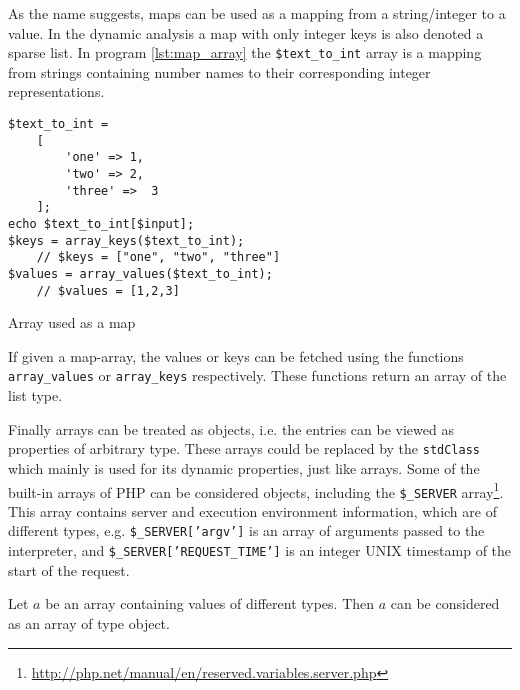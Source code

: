 As the name suggests, maps can be used as a mapping from a string/integer to a value. In the dynamic analysis a map with only integer keys is also denoted a sparse list. In program \ref{lst:map_array} the \texttt{\$text\_to\_int} array is a mapping from strings containing number names to their corresponding integer representations. 

\begin{program}[ht]
\begin{lstlisting}
$text_to_int = 
    [ 
        'one' => 1,
        'two' => 2,
        'three' =>  3
    ];
echo $text_to_int[$input]; 
$keys = array_keys($text_to_int);
    // $keys = ["one", "two", "three"]
$values = array_values($text_to_int);
    // $values = [1,2,3]
\end{lstlisting}
\caption{Array used as a map}
\label{lst:map_array}
\end{program}

If given a map-array, the values or keys can be fetched using the functions \texttt{array\_values} or \texttt{array\_keys} respectively. These functions return an array of the list type. 

Finally arrays can be treated as objects, i.e. the entries can be viewed as properties of arbitrary type. These arrays could be replaced by the \texttt{stdClass} which mainly is used for its dynamic properties, just like arrays. Some of the built-in arrays of PHP can be considered objects, including the \texttt{\$\_SERVER} array\footnote{\url{http://php.net/manual/en/reserved.variables.server.php}}. This array contains server and execution environment information, which are of different types, e.g. \texttt{\$\_SERVER['argv']} is an array of arguments passed to the interpreter, and \texttt{\$\_SERVER['REQUEST\_TIME']} is an integer UNIX timestamp of the start of the request. 

\begin{definition}
\label{def:object}
Let $a$ be an array containing values of different types. Then $a$ can be considered as an array of type object.
\end{definition}



